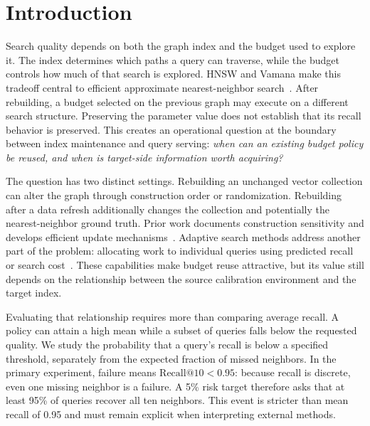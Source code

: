 \section{Introduction}
\label{sec:intro}

Search quality depends on both the graph index and the budget used to explore it. The index determines which paths a query can traverse, while the budget controls how much of that search is explored. HNSW and Vamana make this tradeoff central to efficient approximate nearest-neighbor search~\cite{malkov2020hnsw,subramanya2019diskann}. After rebuilding, a budget selected on the previous graph may execute on a different search structure. Preserving the parameter value does not establish that its recall behavior is preserved. This creates an operational question at the boundary between index maintenance and query serving: \emph{when can an existing budget policy be reused, and when is target-side information worth acquiring?}

The question has two distinct settings. Rebuilding an unchanged vector collection can alter the graph through construction order or randomization. Rebuilding after a data refresh additionally changes the collection and potentially the nearest-neighbor ground truth. Prior work documents construction sensitivity and develops efficient update mechanisms~\cite{elliott2024ordering,singh2021freshdiskann}. Adaptive search methods address another part of the problem: allocating work to individual queries using predicted recall or search cost~\cite{li2020laet,chatzakis2025darth,wang2026annie}. These capabilities make budget reuse attractive, but its value still depends on the relationship between the source calibration environment and the target index.

Evaluating that relationship requires more than comparing average recall. A policy can attain a high mean while a subset of queries falls below the requested quality. We study the probability that a query's recall is below a specified threshold, separately from the expected fraction of missed neighbors. In the primary experiment, failure means $\mathrm{Recall}@10<0.95$: because recall is discrete, even one missing neighbor is a failure. A 5\% risk target therefore asks that at least 95\% of queries recover all ten neighbors. This event is stricter than mean recall of 0.95 and must remain explicit when interpreting external methods.

